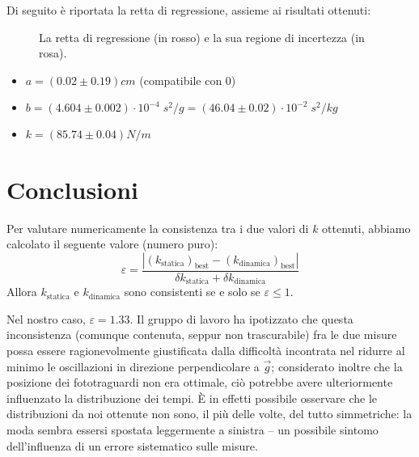 \documentclass{article}
\begin{document}
Di seguito è riportata la retta di regressione, assieme ai risultati ottenuti:

\begin{figure}[H]
    \caption{
        La retta di regressione (in rosso)
        e la sua regione di incertezza (in rosa).
    }
\end{figure}

\begin{itemize}
    \item $a = \left(0.02\pm0.19\right)\unit{cm}$ (compatibile con 0)
    \item $
        b = \left(4.604\pm0.002\right)\cdot10^{-4}\;\unit{s^2\per g}
          = \left(46.04\pm0.02\right)\cdot10^{-2}\;\unit{s^2\per kg}
    $
    \item $k = \left(85.74\pm0.04\right)\unit{N\per m}$
\end{itemize}


\section{Conclusioni}
Per valutare numericamente la consistenza tra i due valori di $k$ ottenuti,
abbiamo calcolato il seguente valore (numero puro):
\[
    \varepsilon =
    \frac{
        \left|\left(k_\text{statica}\right)_\text{best} - \left(k_\text{dinamica}\right)_\text{best}\right|
    }{
        \delta k_\text{statica} + \delta k_\text{dinamica}
    }
\]
Allora $k_\text{statica}$ e $k_\text{dinamica}$ sono consistenti se e solo se $\varepsilon \le 1$.

Nel nostro caso, $\varepsilon = 1.33$. Il gruppo di lavoro ha ipotizzato che
questa inconsistenza (comunque contenuta, seppur non trascurabile) fra le due
misure possa essere ragionevolmente giustificata dalla difficoltà incontrata
nel ridurre al minimo le oscillazioni in direzione perpendicolare a $\vec{g}$;
considerato inoltre che la posizione dei fototraguardi non era ottimale, ciò
potrebbe avere ulteriormente influenzato la distribuzione dei tempi. È in
effetti possibile osservare che le distribuzioni da noi ottenute non sono,
il più delle volte, del tutto simmetriche: la moda sembra essersi spostata
leggermente a sinistra – un possibile sintomo dell'influenza di un
errore sistematico sulle misure.
\end{document}
